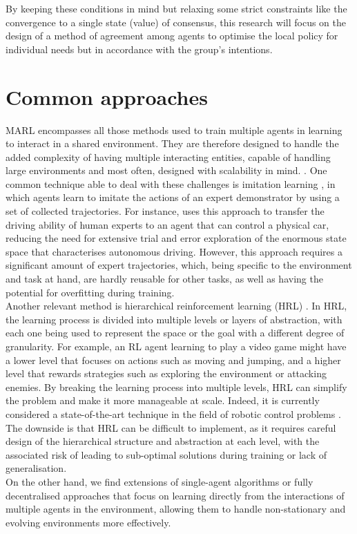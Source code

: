 \documentclass[a4paper,singleside,12pt]{report} %
\begin{document}
By keeping these conditions in mind but relaxing some strict constraints like the convergence to a single state (value) of consensus, this research will focus on the design of a method of agreement among agents to optimise the local policy for individual needs but in accordance with the group's intentions.


\section{Common approaches}\label{common-approaches}
MARL encompasses all those methods used to train multiple agents in learning to interact in a shared environment. They are therefore designed to handle the added complexity of having multiple interacting entities, capable of handling large environments and most often, designed with scalability in mind. \cite{Gronauer2021MultiagentDR, HernandezLeal2019ASA, Stone2022ASO}. One common technique able to deal with these challenges is imitation learning \cite{ACM2018ImitationLearningSurvey}, in which agents learn to imitate the actions of an expert demonstrator by using a set of collected trajectories. For instance, \cite{Osinski2019SimulationBasedRL, Maramotti2022TacklingRA} uses this approach to transfer the driving ability of human experts to an agent that can control a physical car, reducing the need for extensive trial and error exploration of the enormous state space that characterises autonomous driving. However, this approach requires a significant amount of expert trajectories, which, being specific to the environment and task at hand, are hardly reusable for other tasks, as well as having the potential for overfitting during training.\\
Another relevant method is hierarchical reinforcement learning (HRL) \cite{MLKE2022HRLSurvey}. In HRL, the learning process is divided into multiple levels or layers of abstraction, with each one being used to represent the space or the goal with a different degree of granularity. For example, an RL agent learning to play a video game might have a lower level that focuses on actions such as moving and jumping, and a higher level that rewards strategies such as exploring the environment or attacking enemies. By breaking the learning process into multiple levels, HRL can simplify the problem and make it more manageable at scale. Indeed, it is currently considered a state-of-the-art technique in the field of robotic control problems \cite{Nachum2018DataEfficientHR}. The downside is that HRL can be difficult to implement, as it requires careful design of the hierarchical structure and abstraction at each level, with the associated risk of leading to sub-optimal solutions during training or lack of generalisation.\\
On the other hand, we find extensions of single-agent algorithms or fully decentralised approaches that focus on learning directly from the interactions of multiple agents in the environment, allowing them to handle non-stationary and evolving environments more effectively.
\end{document}

